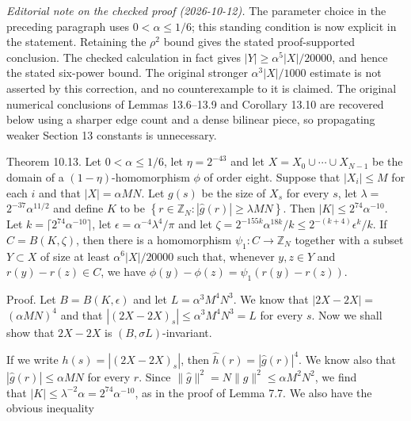 \documentclass[10pt]{article}
\begin{document}
\emph{Editorial note on the checked proof (2026-10-12).}
The parameter choice in the preceding paragraph uses $0<\alpha\leqslant1/6$;
this standing condition is now explicit in the statement. Retaining the
$\rho^2$ bound gives the stated proof-supported conclusion. The checked
calculation in fact gives $|Y|\geqslant\alpha^5|X|/20000$, and hence the
stated six-power bound. The original stronger $\alpha^3|X|/1000$ estimate
is not asserted by this correction, and no counterexample to it is claimed.
The original numerical conclusions of Lemmas 13.6--13.9 and Corollary 13.10
are recovered below using a sharper edge count and a dense bilinear piece,
so propagating weaker Section 13 constants is unnecessary.

Theorem 10.13. Let $0<\alpha\leqslant1/6$, let $\eta=2^{-43}$ and let $X=X_{0} \cup \cdots \cup X_{N-1}$ be the domain of a $(1-\eta)$-homomorphism $\phi$ of order eight. Suppose that $\left|X_{i}\right| \leqslant M$ for each $i$ and that $|X|=\alpha M N$. Let $g(s)$ be the size of $X_{s}$ for every $s$, let $\lambda=$ $2^{-37} \alpha^{11 / 2}$ and define $K$ to be $\left\{r \in \mathbb{Z}_{N}:|\hat{g}(r)| \geqslant \lambda M N\right\}$. Then $|K| \leqslant 2^{74} \alpha^{-10}$. Let $k=\lceil2^{74} \alpha^{-10}\rceil$, let $\epsilon=\alpha^{-4} \lambda^{4} / \pi$ and let $\zeta=2^{-155 k} \alpha^{18 k}/k \leqslant 2^{-(k+4)} \epsilon^{k}/k$. If $C=B(K, \zeta)$, then there is a homomorphism $\psi_{1}: C \rightarrow \mathbb{Z}_{N}$ together with a subset $Y \subset X$ of size at least $\alpha^{6}|X| / 20000$ such that, whenever $y, z \in Y$ and $r(y)-r(z) \in C$, we have $\phi(y)-\phi(z)=\psi_{1}(r(y)-r(z))$.

Proof. Let $B=B(K, \epsilon)$ and let $L=\alpha^{3} M^{4} N^{3}$. We know that $|2 X-2 X|=$ $(\alpha M N)^{4}$ and that $\left|(2 X-2 X)_{s}\right| \leqslant \alpha^{3} M^{4} N^{3}=L$ for every $s$. Now we shall show that $2 X-2 X$ is $(B, \sigma L)$-invariant.

If we write $h(s)=\left|(2 X-2 X)_{s}\right|$, then $\hat{h}(r)=|\hat{g}(r)|^{4}$. We know also that $|\hat{g}(r)| \leqslant \alpha M N$ for every $r$. Since $\|\hat{g}\|^{2}=N\|g\|^{2} \leqslant \alpha M^{2} N^{2}$, we find\\
that $|K| \leqslant \lambda^{-2} \alpha=2^{74} \alpha^{-10}$, as in the proof of Lemma 7.7. We also have the obvious inequality
\end{document}
